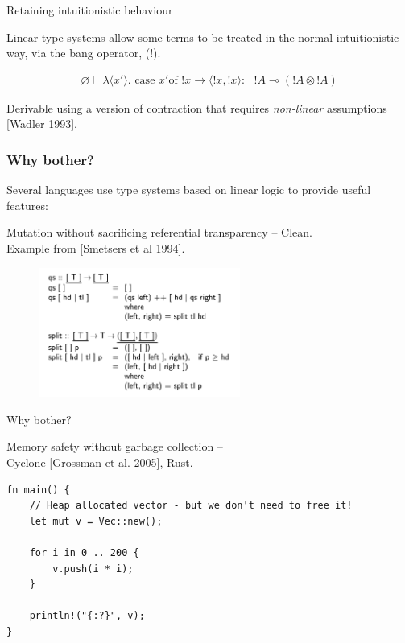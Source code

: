 \documentclass[10pt]{beamer}
\let\emptyset\varnothing
\newcommand{\case}{\text{ case }}
\newcommand{\of}{\text{of }}
\newcommand{\yields}{\multimap}
\begin{document}
\begin{frame}{Retaining intuitionistic behaviour}

Linear type systems allow some terms to be treated in the normal intuitionistic way, via the bang operator, (!).

\begin{eqnarray*}
\emptyset \vdash \lambda \langle x' \rangle . \case x' \of !x \rightarrow \langle !x, !x \rangle :\text{ } !A \yields (!A \otimes !A)
\end{eqnarray*}

Derivable using a version of contraction that requires \textit{non-linear} assumptions [Wadler 1993].

\end{frame}

\begin{frame}

\frametitle{Why bother?}

Several languages use type systems based on linear logic to provide useful features:

Mutation without sacrificing referential transparency -- Clean.\\
Example from [Smetsers et al 1994].

\begin{figure}[h]
\centering
\includegraphics[width=250px]{Clean_Quicksort.png}
\label{}
\end{figure}
\end{frame}

\begin{frame}[fragile]{Why bother?}

Memory safety without garbage collection --\\
	Cyclone [Grossman et al. 2005], Rust.

\begin{verbatim}
fn main() {
    // Heap allocated vector - but we don't need to free it!
    let mut v = Vec::new();

    for i in 0 .. 200 {
        v.push(i * i);
    }

    println!("{:?}", v);
}
\end{verbatim}

\end{frame}
\end{document}
